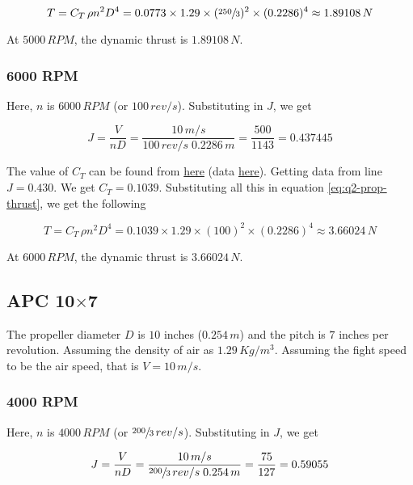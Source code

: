 \begin{equation*}
    T = C_T \, \rho n^2 D^4 = 0.0773 \times 1.29 \times (\sfrac{250}{3})^2 \times (0.2286)^4 \approx 1.89108\,N
\end{equation*}

At $5000\,RPM$, the dynamic thrust is $1.89108\,N$.

\subsubsection*{6000 RPM}

Here, $n$ is $6000\,RPM$ (or $100\,rev/s$). Substituting in $J$, we get

\begin{equation*}
    J = \frac{V}{nD} = \frac{10\,m/s}{100\,rev/s \; 0.2286\,m} = \frac{500}{1143} = 0.437445
\end{equation*}

The value of $C_T$ can be found from \href{https://m-selig.ae.illinois.edu/props/volume-1/plots/apcsf_9x6_ct.png}{here} (data \href{https://m-selig.ae.illinois.edu/props/volume-1/data/apcsf_9x6_kt0983_6017.txt}{here}). Getting data from line $J = 0.430$. We get $C_T = 0.1039$. Substituting all this in equation \ref{eq:q2-prop-thrust}, we get the following

\begin{equation*}
    T = C_T \, \rho n^2 D^4 = 0.1039 \times 1.29 \times (100)^2 \times (0.2286)^4 \approx 3.66024\,N
\end{equation*}

At $6000\,RPM$, the dynamic thrust is $3.66024\,N$.

\subsection{APC 10\texorpdfstring{$\times$}{by}7}

The propeller diameter $D$ is $10$ inches ($0.254\,m$) and the pitch is $7$ inches per revolution. Assuming the density of air as $1.29\,Kg/m^3$.
Assuming the fight speed to be the air speed, that is $V = 10\,m/s$.

\subsubsection*{4000 RPM}

Here, $n$ is $4000\,RPM$ (or $\sfrac{200}{3}\,rev/s$). Substituting in $J$, we get

\begin{equation*}
    J = \frac{V}{nD} = \frac{10\,m/s}{\sfrac{200}{3}\,rev/s \; 0.254\,m} = \frac{75}{127} = 0.59055
\end{equation*}

